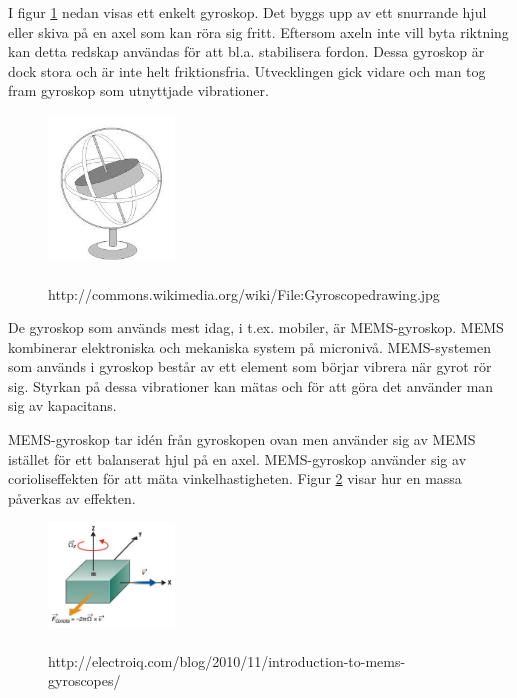 \documentclass[a4paper,12pt,fleqn]{article}
\begin{document}
I figur \ref{fig:gyro} nedan visas ett enkelt gyroskop. Det byggs upp av ett snurrande hjul eller skiva på en axel som kan röra sig fritt. Eftersom axeln inte vill byta riktning kan detta redskap användas för att bl.a. stabilisera fordon. Dessa gyroskop är dock stora och är inte helt friktionsfria. Utvecklingen gick vidare och man tog fram gyroskop som utnyttjade vibrationer.

\begin{figure}[h]
\begin{center}
\caption{\\http://commons.wikimedia.org/wiki/File:Gyroscopedrawing.jpg}
\label{fig:gyro}
\includegraphics[width=0.3\textwidth]
{gyro.jpeg}
\end{center}
\end{figure}


De gyroskop som används mest idag, i t.ex. mobiler, är MEMS-gyroskop. MEMS kombinerar elektroniska och mekaniska system på micronivå. MEMS-systemen som används i gyroskop består av ett element som börjar vibrera när gyrot rör sig. Styrkan på dessa vibrationer kan mätas och för att göra det använder man sig av kapacitans.

MEMS-gyroskop tar idén från gyroskopen ovan men använder sig av MEMS istället för ett balanserat hjul på en axel. MEMS-gyroskop använder sig av corioliseffekten för att mäta vinkelhastigheten. Figur \ref{fig:coriolis} visar hur en massa påverkas av effekten.

\begin{figure}[h]
\begin{center}
\caption{\\http://electroiq.com/blog/2010/11/introduction-to-mems-gyroscopes/}
\label{fig:coriolis}
\includegraphics[width=0.3\textwidth]
{coriolis.png}
\end{center}
\end{figure}
\end{document}

